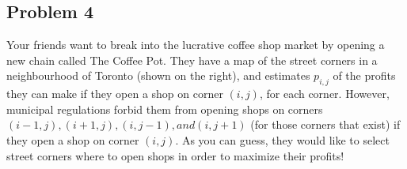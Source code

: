 \documentclass[11pt]{article}
\begin{document}
\subsection*{Problem 4}


Your friends want to break into the lucrative coffee shop market by opening a new chain called The Coffee Pot. They have a map of the street corners in
a neighbourhood of Toronto (shown on the right), and estimates $p_{i,j}$ of the profits they can make if they open a shop on corner $(i,j)$, for each corner.
However, municipal regulations forbid them from opening shops on corners $(i-1,j), (i + 1,j), (i,j-1), and (i,j + 1)$ (for those corners that exist) if they
open a shop on corner $(i,j)$. As you can guess, they would like to select street
corners where to open shops in order to maximize their profits!
\end{document}
